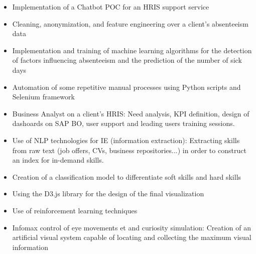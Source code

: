 \documentclass[10pt,letter,ragged2e,withhyper]{altacv}
\renewcommand{\divider}{\vspace{-0.2cm}\textcolor{body!30}{\hdashrule{\linewidth}{0.6pt}{0.5ex}}\smallskip\vspace{-0.1cm}} %
\begin{document}
\begin{paracol}{2}
\divider\smallskip
{}

\begin{itemize}
\end{itemize}

\divider\smallskip
{}

\begin{itemize}
  \item Implementation of a Chatbot POC for an HRIS support service
  \item Cleaning, anonymization, and feature engineering over a client's absenteeism data
  \item Implementation and training of machine learning algorithms for the detection of factors influencing absenteeism and the prediction of the number of sick days
  \item Automation of some repetitive manual processes using Python scripts and Selenium framework
  \item Business Analyst on a client's HRIS: Need analysis, KPI definition, design of dashoards on SAP BO, user support and leading users training sessions.
  \item Use of NLP technologies for IE (information extraction): Extracting skills from raw text (job offers, CVs, business repositories...) in order to construct an index for in-demand skills.
  \item Creation of a classification model to differentiate soft skills and hard skills
  \item Using the D3.js library for the design of the final visualization
\end{itemize}

\divider\smallskip
{}

\begin{itemize}
  \item Use of reinforcement learning techniques
  \item Infomax control of eye movements et and curiosity simulation: Creation of an artificial visual system capable of locating and collecting the maximum visual information
\end{itemize}




\end{paracol}
\end{document}
